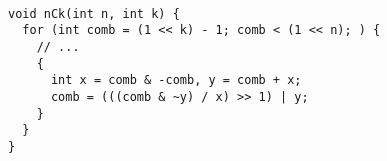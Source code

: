 \begin{lstlisting}

void nCk(int n, int k) {
  for (int comb = (1 << k) - 1; comb < (1 << n); ) {
    // ...
    {
      int x = comb & -comb, y = comb + x;
      comb = (((comb & ~y) / x) >> 1) | y;
    }
  }
}

\end{lstlisting}